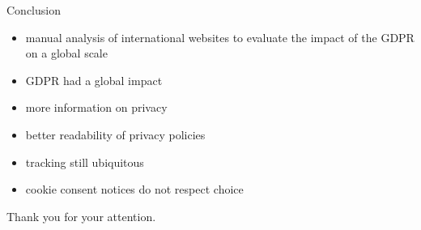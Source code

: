 \documentclass[xcolor={dvipsnames}]{beamer}
\begin{document}
\begin{frame}{Conclusion}
    \begin{itemize}
        \item manual analysis of international websites to evaluate the impact of the GDPR on a global scale
        \item GDPR had a global impact
        \item more information on privacy
        \item better readability of privacy policies
        \item tracking still ubiquitous
        \item cookie consent notices do not respect choice
    \end{itemize}
    \pause
    \centering
    \LARGE
    Thank you for your attention.
\end{frame}
\end{document}
